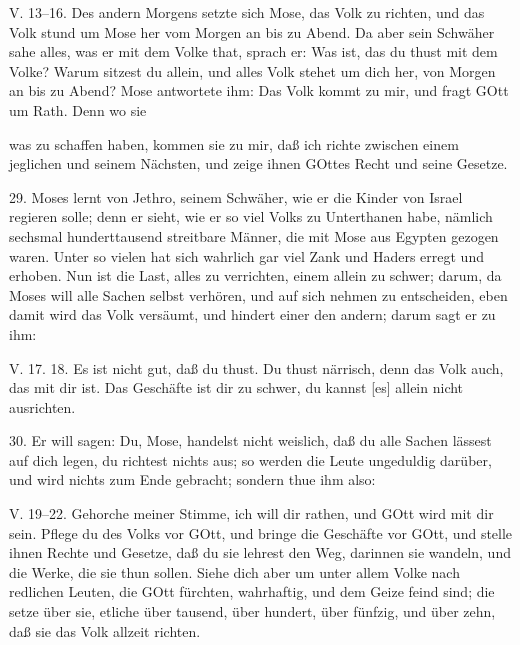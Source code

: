 \begin{schriftzitat}
V. 13–16. Des andern Morgens setzte sich Mose, das Volk zu richten, und das Volk stund um Mose her vom Morgen an bis zu Abend. Da aber sein Schwäher sahe alles, was er mit dem Volke that, sprach er: Was ist, das du thust mit dem Volke? Warum sitzest du allein, und alles Volk stehet um dich her, von Morgen an bis zu Abend? Mose antwortete ihm: Das Volk kommt zu mir, und fragt GOtt um Rath. Denn wo sie
\end{schriftzitat}

was zu schaffen haben, kommen sie zu mir, daß ich richte zwischen einem jeglichen und seinem Nächsten, und zeige ihnen GOttes Recht und seine Gesetze.

29. Moses lernt von Jethro, seinem Schwäher, wie er die Kinder von Israel regieren solle; denn er sieht, wie er so viel Volks zu Unterthanen habe, nämlich sechsmal hunderttausend streitbare Männer, die mit Mose aus Egypten gezogen waren. Unter so vielen hat sich wahrlich gar viel Zank und Haders erregt und erhoben. Nun ist die Last, alles zu verrichten, einem allein zu schwer; darum, da Moses will alle Sachen selbst verhören, und auf sich nehmen zu entscheiden, eben damit wird das Volk versäumt, und hindert einer den andern; darum sagt er zu ihm:

\begin{schriftzitat}
V. 17. 18. Es ist nicht gut, daß du thust. Du thust närrisch, denn das Volk auch, das mit dir ist. Das Geschäfte ist dir zu schwer, du kannst [es] allein nicht ausrichten.
\end{schriftzitat}

30. Er will sagen: Du, Mose, handelst nicht weislich, daß du alle Sachen lässest auf dich legen, du richtest nichts aus; so werden die Leute ungeduldig darüber, und wird nichts zum Ende gebracht; sondern thue ihm also:

\begin{schriftzitat}
V. 19–22. Gehorche meiner Stimme, ich will dir rathen, und GOtt wird mit dir sein. Pflege du des Volks vor GOtt, und bringe die Geschäfte vor GOtt, und stelle ihnen Rechte und Gesetze, daß du sie lehrest den Weg, darinnen sie wandeln, und die Werke, die sie thun sollen. Siehe dich aber um unter allem Volke nach redlichen Leuten, die GOtt fürchten, wahrhaftig, und dem Geize feind sind; die setze über sie, etliche über tausend, über hundert, über fünfzig, und über zehn, daß sie das Volk allzeit richten.
\end{schriftzitat}

